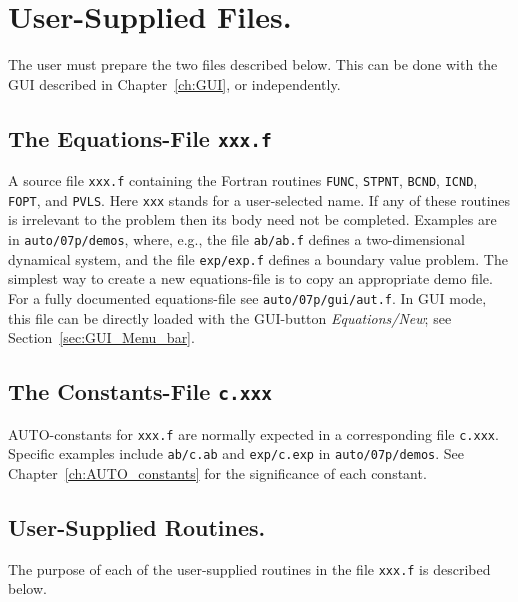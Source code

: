 \documentclass[12pt]{report}
\begin{document}
\chapter{ User-Supplied Files.} \label{ch:User_supplied_files}
The user must prepare the two files described below.
This can be done with the GUI described in Chapter~\ref{ch:GUI}, 
or independently.

\section{ The Equations-File {\tt xxx.f}} 
A source file {\tt xxx.f} containing the Fortran routines
{\tt FUNC}, {\tt STPNT}, {\tt BCND}, {\tt ICND}, {\tt FOPT}, and {\tt PVLS}.
Here {\tt xxx} stands for a user-selected name. 
If any of these routines is irrelevant 
to the problem then its body need not be completed.
Examples are in {\tt auto/07p/demos}, where, e.g.,
the file {\tt ab/ab.f} defines a two-dimensional dynamical system,
and the file {\tt exp/exp.f} defines a boundary value problem.
The simplest way to create a new equations-file is to copy 
an appropriate demo file.
For a fully documented equations-file see {\tt auto/07p/gui/aut.f}.
In GUI mode, this file can be directly loaded with the GUI-button 
{\it Equations/New}; see Section~\ref{sec:GUI_Menu_bar}.
 

\section{ The Constants-File {\tt c.xxx}} 
{\cal AUTO}-constants for {\tt xxx.f} are normally expected 
in a corresponding file {\tt c.xxx}.
Specific examples include {\tt ab/c.ab}
and {\tt exp/c.exp} in {\tt auto/07p/demos}.
See Chapter~\ref{ch:AUTO_constants}
for the significance of each constant.

\newpage
\section{ User-Supplied Routines.} \label{sec: User_supplied_routines}
The purpose of each of the user-supplied routines in
the file {\tt xxx.f} is described below.
  
\end{document}
